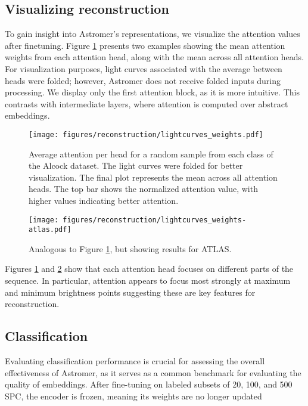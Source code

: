 \subsection{Visualizing reconstruction}
To gain insight into Astromer's representations, we visualize the attention values after finetuning. Figure \ref{fig:attention_vis} presents two examples showing the mean attention weights from each attention head, along with the mean across all attention heads. For visualization purposes, light curves associated with the average between heads were folded; however, Astromer does not receive folded inputs during processing. We display only the first attention block, as it is more intuitive. This contrasts with intermediate layers, where attention is computed over abstract embeddings.
\begin{figure}
    \centering
    \texttt{[image: figures/reconstruction/lightcurves\_weights.pdf]}
    \caption{Average attention per head for a random sample from each class of the Alcock dataset. The light curves were folded for better visualization. The final plot represents the mean across all attention heads. The top bar shows the normalized attention value, with higher values indicating better attention.}
    \label{fig:attention_vis}    
\end{figure}
\begin{figure}
    \centering
    \texttt{[image: figures/reconstruction/lightcurves\_weights-atlas.pdf]}
    \caption{Analogous to Figure \ref{fig:attention_vis}, but showing results for ATLAS.}
    \label{fig:attention_vis_altas}    
\end{figure}
Figures \ref{fig:attention_vis} and \ref{fig:attention_vis_altas} show that each attention head focuses on different parts of the sequence. In particular, attention appears to focus most strongly at maximum and minimum brightness points suggesting these are key features for reconstruction. 



\subsection{Classification}
Evaluating classification performance is crucial for assessing the overall effectiveness of Astromer, as it serves as a common benchmark for evaluating the quality of embeddings. After fine-tuning on labeled subsets of 20, 100, and 500 SPC, the encoder is frozen, meaning its weights are no longer updated

